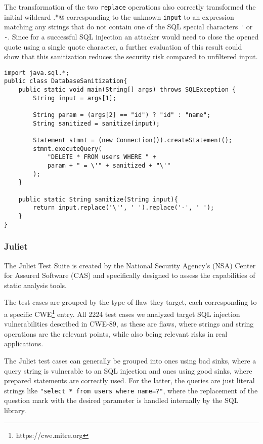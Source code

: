 The transformation of the two \lstinline|replace| operations also correctly transformed the initial wildcard \Verb@.*@ corresponding to the unknown \lstinline|input| to an expression matching any strings that do not contain one of the SQL special characters \lstinline|'| or \lstinline|-|. Since for a successful SQL injection an attacker would need to close the opened quote using a single quote character, a further evaluation of this result could show that this sanitization reduces the security risk compared to unfiltered input.

\begin{lstlisting}[float, escapechar=|, numbers=right, caption=SQL query sanitization code example, label=lst:sqlSanit, captionpos=b, basicstyle=\small\ttfamily]
import java.sql.*;
public class DatabaseSanitization{
	public static void main(String[] args) throws SQLException {
		String input = args[1];
		
		String param = (args[2] == "id") ? "id" : "name";
		String sanitized = sanitize(input);
		
		Statement stmnt = (new Connection()).createStatement();
		stmnt.executeQuery(
			"DELETE * FROM users WHERE " + 
			param + " = \'" + sanitized + "\'"
		);
	}
	
	public static String sanitize(String input){
		return input.replace('\'', ' ').replace('-', ' ');
	}
}
\end{lstlisting}

\subsubsection{Juliet}

The Juliet Test Suite is created by the National Security Agency’s (NSA) Center for Assured Software (CAS) and specifically designed to assess the capabilities of static analysis tools.

The test cases are grouped by the type of flaw they target, each corresponding to a specific CWE\footnote{https://cwe.mitre.org} entry. All 2224 test cases we analyzed target SQL injection vulnerabilities described in CWE-89, as these are flaws, where strings and string operations are the relevant points, while also being relevant risks in real applications.

The Juliet test cases can generally be grouped into ones using bad sinks, where a query string is vulnerable to an SQL injection and ones using good sinks, where prepared statements are correctly used. For the latter, the queries are just literal strings like \lstinline|"select * from users where name=?"|, where the replacement of the question mark with the desired parameter is handled internally by the SQL library.

